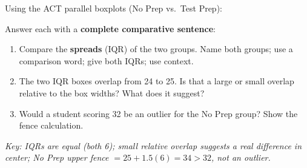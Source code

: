 \documentclass[aspectratio=169, 11pt]{beamer}
\begin{document}
{
\begin{frame}[t, plain]
  \vspace{0.8em}%
  \hspace{0.55cm}%
  \begin{minipage}{0.9\textwidth}
    \small
    Using the ACT parallel boxplots (No Prep vs.\ Test Prep):

    \vspace{0.6em}
    Answer each with a \textbf{complete comparative sentence}:
    \begin{enumerate}\setlength{\itemsep}{0.55em}
      \item Compare the \textbf{spreads} (IQR) of the two groups.
            Name both groups; use a comparison word; give both IQRs; use context.
      \item The two IQR boxes overlap from 24 to 25. Is that a
            large or small overlap relative to the box widths?
            What does it suggest?
      \item Would a student scoring 32 be an outlier for the No Prep group?
            Show the fence calculation.
    \end{enumerate}

    \vspace{0.5em}
    {\color{navy}\small\textit{Key:
    IQRs are equal (both 6); small relative overlap suggests a real
    difference in center; No Prep upper fence $= 25 + 1.5(6) = 34 > 32$,
    not an outlier.}}
  \end{minipage}
\end{frame}
}
\end{document}
